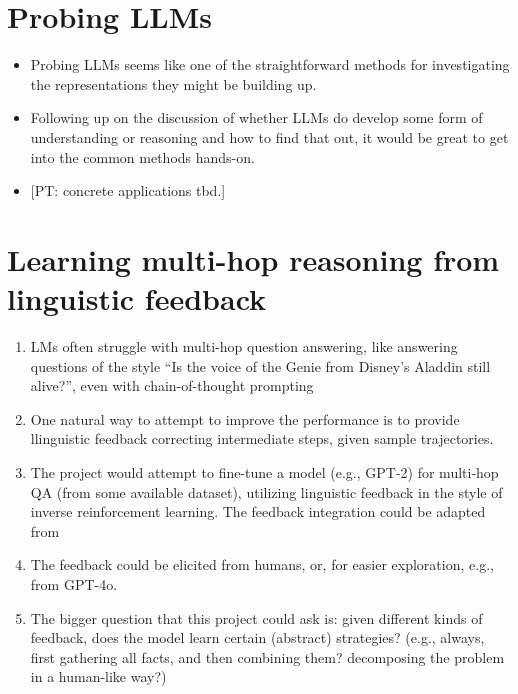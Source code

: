 \documentclass[fleqn,reqno,10pt]{article}
\newcommand{\pt}[1]{\textcolor{CSP-accent-1}{[PT: #1]}}
\begin{document}
\section{Probing LLMs}
\begin{itemize}
  \item Probing LLMs seems like one of the straightforward methods for investigating the representations they might be building up.
  \item Following up on the discussion of whether LLMs do develop some form of understanding or reasoning and how to find that out, it would be great to get into the common methods hands-on.
  \item \pt{concrete applications tbd.}
\end{itemize}

\section{Learning multi-hop reasoning from linguistic feedback}
\begin{enumerate}
	\item LMs often struggle with multi-hop question answering, like answering questions of the style ``Is the voice of the Genie from Disney’s Aladdin still alive?'', even with chain-of-thought prompting
	\item One natural way to attempt to improve the performance is to provide llinguistic feedback correcting intermediate steps, given sample trajectories.
	\item The project would attempt to fine-tune a model (e.g., GPT-2) for multi-hop QA (from some available dataset), utilizing linguistic feedback in the style of inverse reinforcement learning. The feedback integration could be adapted from \citep{sumers2021learning}
	\item The feedback could be elicited from humans, or, for easier exploration, e.g., from GPT-4o.
	\item The bigger question that this project could ask is: given different kinds of feedback, does the model learn certain (abstract) strategies? (e.g., always, first gathering all facts, and then combining them? decomposing the problem in a human-like way?)
\end{enumerate}
\end{document}

